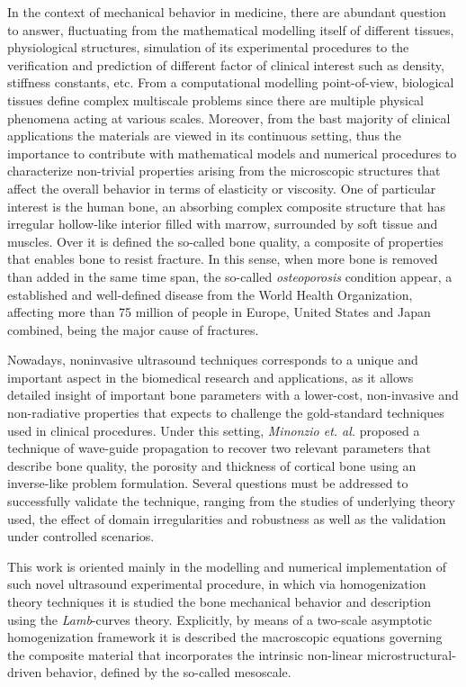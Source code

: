 \begin{intro}
In the context of mechanical behavior in medicine, there are abundant question to answer, fluctuating from the mathematical modelling itself of different tissues, physiological structures, simulation of its experimental procedures to the verification and prediction of different factor of clinical interest such as density, stiffness constants, etc. From a computational modelling point-of-view, biological tissues define complex multiscale problems since there are multiple physical phenomena acting at various scales. Moreover, from the bast majority of clinical applications the materials are viewed in its continuous setting, thus the importance to contribute with mathematical models and numerical procedures to characterize non-trivial properties arising from the microscopic structures that affect the overall behavior in terms of elasticity or viscosity.
One of particular interest is the human bone, an absorbing complex composite structure that has irregular hollow-like interior filled with marrow, surrounded by soft tissue and muscles. Over it is defined the so-called bone quality, a composite of properties that enables bone to resist fracture. In this sense, when more bone is removed than added in the same time span, the so-called \textit{osteoporosis} condition appear, a established and well-defined disease from the World Health Organization, affecting more than 75 million of people in Europe, United States and Japan combined, being the major cause of fractures.

Nowadays, noninvasive ultrasound techniques corresponds to a unique and important aspect in the biomedical research and applications, as it allows detailed insight of important bone parameters with a lower-cost, non-invasive and non-radiative properties that expects to challenge the gold-standard techniques used in clinical procedures. Under this setting, \textit{Minonzio et. al.} \cite{Minonzio2018} proposed a technique of wave-guide propagation to recover two relevant parameters that describe bone quality, the porosity and thickness of cortical bone using an inverse-like problem formulation. Several questions must be addressed to successfully validate the technique, ranging from the studies of underlying theory used, the effect of domain irregularities and robustness as well as the validation under controlled scenarios.


This work is oriented mainly in the modelling and numerical implementation of such novel ultrasound experimental procedure, in which via homogenization theory techniques it is studied the bone mechanical behavior and  description using the \textit{Lamb}-curves theory. Explicitly, by means of a two-scale asymptotic homogenization framework it is described the macroscopic equations governing the composite material that incorporates the intrinsic non-linear microstructural-driven behavior, defined by the so-called mesoscale.


\end{intro}
